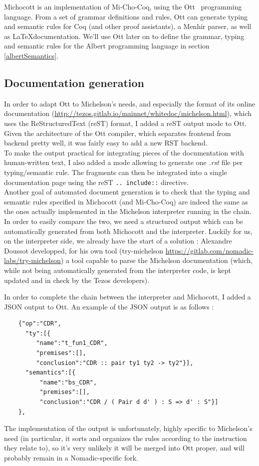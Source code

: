 \documentclass{report}
\begin{document}
Michocott is an implementation of Mi-Cho-Coq, using the Ott~\cite{ottLang} programming language. From a set of grammar definitions and rules, Ott can generate typing and semantic rules for Coq (and other proof assistants), a Menhir parser, as well as \LaTeX documentation. We'll use Ott later on to define the grammar, typing and semantic rules for the Albert programming language in section \ref{albertSemantics}.

\subsection{Documentation generation}

In order to adapt Ott to Michelson's needs, and especially the format of its online documentation (\url{http://tezos.gitlab.io/mainnet/whitedoc/michelson.html}), which uses the ReStructuredText (reST) format, I added a reST output mode to Ott. Given the architecture of the Ott compiler, which separates frontend from backend pretty well, it was fairly easy to add a new RST backend.\\
To make the output practical for integrating pieces of the documentation with human-written text, I also added a mode allowing to generate one \textit{.rst} file per typing/semantic rule. The fragments can then be integrated into a single documentation page using the reST \texttt{.. include::} directive.\\

Another goal of automated document generation is to check that the typing and semantic rules specified in Michocott (and Mi-Cho-Coq) are indeed the same as the ones actually implemented in the Michelson interpreter running in the chain. In order to easily compare the two, we need a structured output which can be automatically generated from both Michocott and the interpreter. Luckily for us, on the interpreter side, we already have the start of a solution : Alexandre Doussot developped, for his own tool (try-michelson \url{https://gitlab.com/nomadic-labs/try-michelson}) a tool capable to parse the Michelson documentation (which, while not being automatically generated from the interpreter code, is kept updated and in check by the Tezos developers).

In order to complete the chain between the interpreter and Michocott, I added a JSON output to Ott. An example of the JSON output is as follows :
\begin{verbatim}
    {"op":"CDR",
      "ty":[{
         "name":"t_fun1_CDR",
         "premises":[],
         "conclusion":"CDR :: pair ty1 ty2 -> ty2"}],
      "semantics":[{
          "name":"bs_CDR",
          "premises":[],
          "conclusion":"CDR / ( Pair d d' ) : S => d' : S"}]
    },
\end{verbatim}
The implementation of the output is unfortunately, highly specific to Michelson's need (in particular, it sorts and organizes the rules according to the instruction they relate to), so it's very unlikely it will be merged into Ott proper, and will probably remain in a Nomadic-specific fork.
\end{document}
